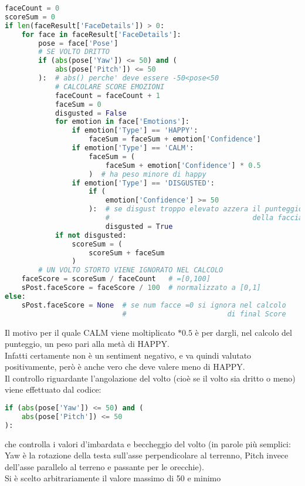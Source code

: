 \begin{lstlisting}[language=Python]
faceCount = 0
scoreSum = 0
if len(faceResult['FaceDetails']) > 0:
    for face in faceResult['FaceDetails']:
        pose = face['Pose']
        # SE VOLTO DRITTO
        if (abs(pose['Yaw']) <= 50) and (
            abs(pose['Pitch']) <= 50
        ):  # abs() perche' deve essere -50<pose<50
            # CALCOLARE SCORE EMOZIONI
            faceCount = faceCount + 1
            faceSum = 0
            disgusted = False
            for emotion in face['Emotions']:
                if emotion['Type'] == 'HAPPY':
                    faceSum = faceSum + emotion['Confidence']
                if emotion['Type'] == 'CALM':
                    faceSum = (
                        faceSum + emotion['Confidence'] * 0.5
                    )  # ha peso minore di happy
                if emotion['Type'] == 'DISGUSTED':
                    if (
                        emotion['Confidence'] >= 50
                    ):  # se disgust troppo elevato azzera il punteggio 
                        #                                  della faccia
                        disgusted = True
            if not disgusted: 
                scoreSum = (
                    scoreSum + faceSum
                )  
        # UN VOLTO STORTO VIENE IGNORATO NEL CALCOLO
    faceScore = scoreSum / faceCount   # =[0,100]
    sPost.faceScore = faceScore / 100  # normalizzato a [0,1]
else:
    sPost.faceScore = None  # se num facce =0 si ignora nel calcolo 
                            #                        di final Score 
\end{lstlisting}
Il motivo per il quale CALM viene moltiplicato $*0.5$ è per dargli, nel calcolo del punteggio, un
peso pari alla metà di HAPPY.\\
Infatti certamente non è un sentiment negativo, e va quindi
valutato positivamente, però è anche vero che deve valere meno di HAPPY.\\
Il controllo riguardante l'angolazione del volto (cioè se il volto sia dritto o meno) viene
effettuato dal codice:
\begin{lstlisting}[language=Python]
if (abs(pose['Yaw']) <= 50) and (
    abs(pose['Pitch']) <= 50
):
\end{lstlisting}
che controlla i valori d'imbardata e beccheggio del volto (in parole più semplici: Yaw è 
la rotazione della testa sull'asse perpendicolare al terrenno, Pitch invece dell'asse parallelo al 
terreno e passante per le orecchie). \\
Si è scelto arbitrariamente il valore massimo di 50 e minimo 
